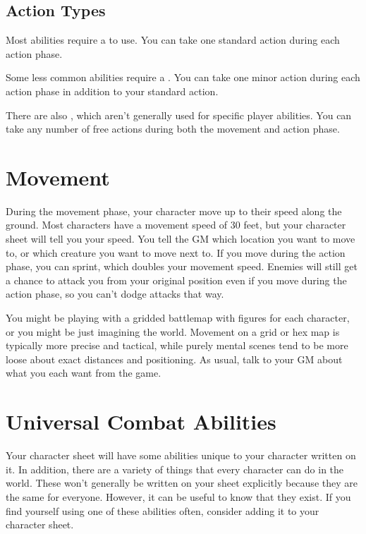   \subsection{Action Types}
    Most abilities require a  to use.
    You can take one standard action during each action phase.

    Some less common abilities require a .
    You can take one minor action during each action phase in addition to your standard action.

    There are also , which aren't generally used for specific player abilities.
    You can take any number of free actions during both the movement and action phase.

\section{Movement}\label{Movement}
  During the movement phase, your character move up to their speed along the ground.
  Most characters have a movement speed of 30 feet, but your character sheet will tell you your speed.
  You tell the GM which location you want to move to, or which creature you want to move next to.
  If you move during the action phase, you can sprint, which doubles your movement speed.
  Enemies will still get a chance to attack you from your original position even if you move during the action phase, so you can't dodge attacks that way.

  You might be playing with a gridded battlemap with figures for each character, or you might be just imagining the world.
  Movement on a grid or hex map is typically more precise and tactical, while purely mental scenes tend to be more loose about exact distances and positioning.
  As usual, talk to your GM about what you each want from the game.

\section{Universal Combat Abilities}
  Your character sheet will have some abilities unique to your character written on it.
  In addition, there are a variety of things that every character can do in the world.
  These won't generally be written on your sheet explicitly because they are the same for everyone.
  However, it can be useful to know that they exist.
  If you find yourself using one of these abilities often, consider adding it to your character sheet.

